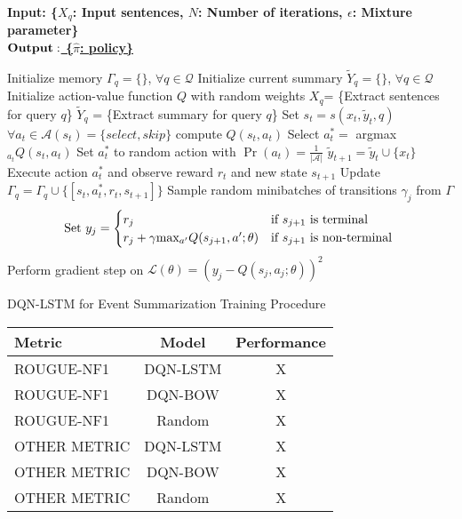 \documentclass[12pt]{article}
\begin{document}
\begin{algorithm}
    \bf{Input:} { \rm  \{$X_q$: Input sentences, $N$: Number of iterations, $\epsilon$: Mixture parameter\} } \\
    \underline{$\bf{Output: }$ \rm \{$\hat{\pi}$: policy\} }
\begin{algorithmic}[1]
\STATE \rm Initialize memory $\Gamma_q = \{\} $, $\forall q \in \mathcal{Q}$
\STATE \rm Initialize current summary $\tilde{Y}_q = \{\} $, $\forall q \in \mathcal{Q}$
\STATE \rm Initialize action-value function $Q$ with random weights
		\STATE $X_q$= \{Extract sentences for query $q$\}
		\STATE $\tilde{Y}_q$ = \{Extract summary for query $q$\}
			\STATE Set $s_t = s(x_t, \tilde{y}_t, q)$
			\STATE $ \forall a_t \in \mathcal{A}(s_t) = \{select, skip\}$ \textrm{compute} $Q(s_t, a_t)$
			\STATE Select $a^{*}_t =$ argmax$_{a_{t}}Q(s_t, a_t)$
				\STATE  Set $a^{*}_t $ to random action with $\Pr(a_t) =\frac{1}{| \mathcal{A} |} $
			\ENDIF
				\STATE $\tilde{y}_{t+1} = \tilde{y}_t \cup  \{ x_t \} $
			\ENDIF	
			\STATE Execute action $a^{*}_t$ and observe reward $r_t$ and new state $s_{t+1}$
			\STATE Update $\Gamma_q = \Gamma_q \cup \{ [s_t, a^{*}_t, r_t, s_{t+1}]\}$
		\ENDFOR
	\ENDFOR
		\STATE Sample random minibatches of transitions $\gamma_j$ from $\Gamma$
		\STATE 	\[ 		\textrm{Set } y_j= 
					\begin{cases}
						r_j              								& \text{if $s_{j+1}$ is terminal } \\
					     	r_j + \gamma $max$_{a'}Q(s_{j+1}, a'; \theta) 	& \text{if $s_{j+1}$ is non-terminal } 
					\end{cases} 
					\]
        		\STATE Perform gradient step on $\mathcal{L}(\theta) = (y_j - Q(s_j, a_j; \theta))^2$
\ENDFOR
  \end{algorithmic}
    \caption{DQN-LSTM for Event Summarization Training Procedure}
\end{algorithm}


\begin{tabular}{ l | c | c  }
	\hline
	Metric  & Model  & Performance\\ \hline \hline
  	ROUGUE-NF1 & DQN-LSTM  & X \\
  	ROUGUE-NF1 & DQN-BOW  & X \\
  	ROUGUE-NF1 & Random  & X \\ \hline
  	OTHER METRIC & DQN-LSTM  & X \\
  	OTHER METRIC & DQN-BOW  & X \\
  	OTHER METRIC & Random  & X \\ \hline
	\hline
\end{tabular}



\newpage


\end{document}
